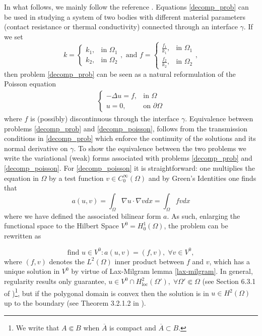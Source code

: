 In what follows, we mainly follow the reference \cite{quarteroni1999domain}. Equations \eqref{decomp_prob} can be used in studying a system of two bodies with different material parameters (contact resistance or thermal conductivity) connected through an interface \(\gamma\). If we set
\[
k = \begin{cases}
    k_1,& \text{in } \Omega_1\\
    k_2,& \text{in } \Omega_2
\end{cases}, \text{ and }
f = \begin{cases}
    \frac{f_1}{k_1},& \text{in } \Omega_1\\
    \frac{f_2}{k_2},& \text{in } \Omega_2
\end{cases},   
\]
then problem \eqref{decomp_prob} can be seen as a natural reformulation of the Poisson equation
\begin{align}\label{decomp_poisson}
    \begin{cases}
        -\Delta u = f, & \text{in }\Omega \\
        u = 0, & \text{on } \partial\Omega
    \end{cases}
\end{align}
where \(f\) is (possibly) discontinuous through the interface \(\gamma\). Equivalence between problems \eqref{decomp_prob} and \eqref{decomp_poisson}, follows from the transmission conditions in \eqref{decomp_prob} which enforce the continuity of the solutions and its normal derivative on \(\gamma\). To show the equivalence between the two problems we write the variational (weak) forms associated with problems \eqref{decomp_prob} and \eqref{decomp_poisson}. For \eqref{decomp_poisson} it is straightforward: one multiplies the equation in \(\Omega\) by a test function \(v \in C^\infty_0(\Omega)\) and by Green's Identities one finds that
\[
a(u,v)=\int_\Omega \nabla u \cdot \nabla v dx = \int_\Omega f v dx
\]
where we have defined the associated bilinear form \(a\). As such, enlarging the functional space to the Hilbert Space \(V^0=H^1_0(\Omega)\), the problem can be rewritten as

\begin{equation}\label{weak_poisson}
    \text{find } u \in V^0: a(u,v) = (f, v), \; \forall v \in V^0,   
\end{equation}
where \((f,v)\) denotes the \(L^2(\Omega)\) inner product between \(f\) and \(v\), which has a unique solution in \(V^0\) by virtue of Lax-Milgram lemma \ref{lax-milgram}. In general, regularity results only guarantee, \(u \in V^0 \cap H^2_{\text{loc}}(\Omega'), \; \forall \Omega' \Subset \Omega\) (see Section 6.3.1 of \cite{evans2022partial})\footnote{We write that \(A \Subset B\) when \(\overline{A}\) is compact and \(\overline{A} \subset B\).}, but if the polygonal domain is convex then the solution is in \(u \in H^2(\Omega)\) up to the boundary (see Theorem 3.2.1.2 in \cite{grisvard2011elliptic}). 

